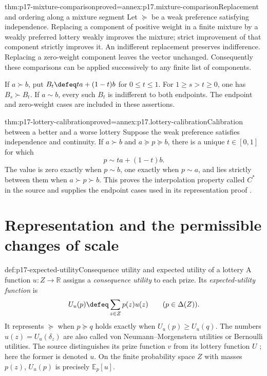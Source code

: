 \begin{hblemma}{thm:p17-mixture-comparison}{proved=annex:p17.mixture-comparison}{Replacement and ordering along a mixture segment}
Let \(\succeq\) be a weak preference satisfying independence.
Replacing a component of positive weight in a finite mixture by a weakly
preferred lottery weakly improves the mixture; strict improvement of that
component strictly improves it. An indifferent replacement preserves
indifference. Replacing a zero-weight component leaves the vector unchanged.
Consequently these comparisons can be applied successively to any finite
list of components.

If \(a\succ b\), put \(B_t\defeq ta+(1-t)b\) for \(0\leq t\leq1\).
For \(1\geq s>t\geq0\), one has \(B_s\succ B_t\).
If \(a\sim b\), every such \(B_t\) is indifferent to both endpoints.
The endpoint and zero-weight cases are included in these assertions.
\end{hblemma}

\begin{hblemma}{thm:p17-lottery-calibration}{proved=annex:p17.lottery-calibration}{Calibration between a better and a worse lottery}
Suppose the weak preference satisfies independence and continuity.
If \(a\succ b\) and \(a\succeq p\succeq b\), there is a unique
\(t\in[0,1]\) for which
\[
                            p\sim ta+(1-t)b.
\]
The value is zero exactly when \(p\sim b\), one exactly when
\(p\sim a\), and lies strictly between them when
\(a\succ p\succ b\). This proves the interpolation property called
\(C^*\) in the source and supplies the endpoint cases used in its
representation proof \cite[pp.~98--100]{Rubinstein2015LectureNotes}.
\end{hblemma}

\section{Representation and the permissible changes of scale}
\label{sec:p17-expected-utility-representation}

\begin{hbdefinition}{def:p17-expected-utility}{Consequence utility and expected utility of a lottery}
A function \(u:Z\to\mathbb R\) assigns a \emph{consequence utility}
to each prize. Its \emph{expected-utility function} is
\[
                U_u(p)\defeq\sum_{z\in Z}p(z)u(z)
                         \qquad(p\in\Delta(Z)).
\]
It represents \(\succeq\) when
\(p\succeq q\) holds exactly when \(U_u(p)\geq U_u(q)\).
The numbers \(u(z)=U_u(\delta_z)\) are also called von Neumann--Morgenstern
utilities or Bernoulli utilities. The source distinguishes its prize
function \(v\) from its lottery function \(U\)
\cite[p.~99]{Rubinstein2015LectureNotes}; here the former is denoted \(u\).
On the finite probability space \(Z\) with masses \(p(z)\),
\(U_u(p)\) is precisely \(\mathbb E_p[u]\).
\end{hbdefinition}

